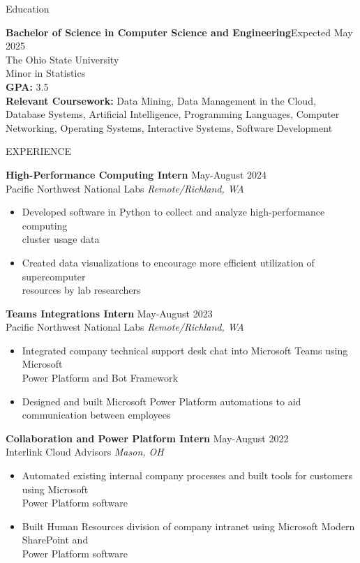 \documentclass{resume} %
\begin{document}
\begin{rSection}{Education}

{\bf Bachelor of Science in Computer Science and Engineering}\hfill {Expected May 2025 }\\ 
The Ohio State University \\
Minor in Statistics \smallskip \\
{\bf GPA:} 3.5\\
{\bf Relevant Coursework:} Data Mining, Data Management in the Cloud, Database Systems, Artificial Intelligence, Programming Languages, Computer Networking, Operating Systems, Interactive Systems, Software Development

\end{rSection}

\begin{rSection}{EXPERIENCE}

\textbf{High-Performance Computing Intern} \hfill May-August 2024\\
Pacific Northwest National Labs \hfill \textit{Remote/Richland, WA}
 \begin{itemize}
    \itemsep -2pt {} 
	\item Developed software in Python to collect and analyze high-performance computing\\ cluster usage data 
	\item Created data visualizations to encourage more efficient utilization of supercomputer \\resources by lab researchers
    
 \end{itemize}
 
\textbf{Teams Integrations Intern} \hfill May-August 2023\\
Pacific Northwest National Labs \hfill \textit{Remote/Richland, WA}
 \begin{itemize}
    \itemsep -2pt {} 
    \item Integrated company technical support desk chat into Microsoft Teams using Microsoft \\Power Platform and Bot Framework
    \item Designed and built Microsoft Power Platform automations to aid communication between employees
 \end{itemize}

 \textbf{Collaboration and Power Platform Intern} \hfill May-August 2022\\
Interlink Cloud Advisors \hfill \textit{Mason, OH}
 \begin{itemize}
    \itemsep -2pt {} 
    \item Automated existing internal company processes and built tools for customers using Microsoft \\Power Platform software
    \item Built Human Resources division of company intranet using Microsoft Modern SharePoint and \\Power Platform software
 \end{itemize}


\end{rSection}
\end{document}
